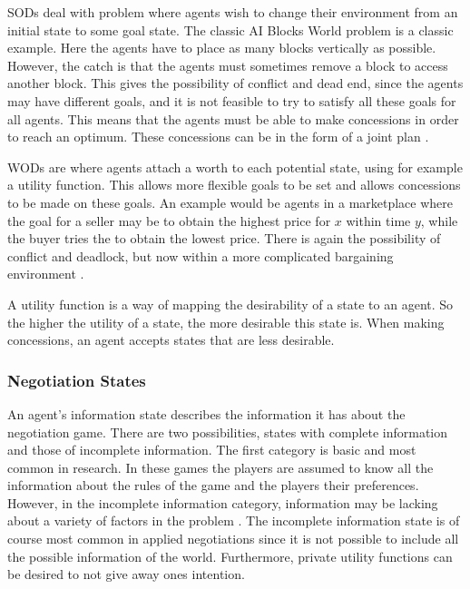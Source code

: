 SODs deal with problem where agents wish to change their environment from an initial state to some goal state. The classic AI Blocks World problem is a classic example. Here the agents have to place as many blocks vertically as possible. However, the catch is that the agents must sometimes remove a block to access another block. This gives the possibility of conflict and dead end, since the agents may have different goals, and it is not feasible to try to satisfy all these goals for all agents. This means that the agents must be able to make concessions in order to reach an optimum. These concessions can be in the form of a joint plan \citep{rosenschein1994rules}.

WODs are where agents attach a worth to each potential state, using for example a utility function. This allows more flexible goals to be set and allows concessions to be made on these goals. An example would be agents in a marketplace where the goal for a seller may be to obtain the highest price for $x$ within time $y$, while the buyer tries the to obtain the lowest price. There is again the possibility of conflict and deadlock, but now within a more complicated bargaining environment \citep{anumba2003negotiation, fatima2014negotiation}.

\begin{mdframed}[style = mystyle, frametitle = Utility Function]
A utility function is a way of mapping the desirability of a state to an agent. So the higher the utility of a state, the more desirable this state is. When making concessions, an agent accepts states that are less desirable. 
\end{mdframed}

\subsubsection{Negotiation States}
An agent’s information state describes the information it has about the negotiation game. There are two possibilities, states with complete information and those of incomplete information. The first category is basic and most common in research. In these games the players are assumed to know all the information about the rules of the game and the players their preferences. However, in the incomplete information category, information may be lacking about a variety of factors in the problem \citep{fatima2004agenda}. The incomplete information state is of course most common in applied negotiations since it is not possible to include all the possible information of the world. Furthermore, private utility functions can be desired to not give away ones intention.
